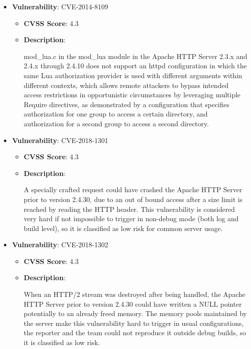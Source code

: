 \documentclass{article}
\begin{document}
\begin{itemize}
        \item \textbf{Vulnerability}: CVE-2014-8109
        \begin{itemize}
            \item \textbf{CVSS Score}:  4.3 
            \item \textbf{Description}:
            \parbox[t]{0.9\linewidth}{
                \ttfamily mod\_lua.c in the mod\_lua module in the Apache HTTP Server 2.3.x and 2.4.x through 2.4.10 does not support an httpd configuration in which the same Lua authorization provider is used with different arguments within different contexts, which allows remote attackers to bypass intended access restrictions in opportunistic circumstances by leveraging multiple Require directives, as demonstrated by a configuration that specifies authorization for one group to access a certain directory, and authorization for a second group to access a second directory.
            }
        \end{itemize}
    
        \item \textbf{Vulnerability}: CVE-2018-1301
        \begin{itemize}
            \item \textbf{CVSS Score}:  4.3 
            \item \textbf{Description}:
            \parbox[t]{0.9\linewidth}{
                \ttfamily A specially crafted request could have crashed the Apache HTTP Server prior to version 2.4.30, due to an out of bound access after a size limit is reached by reading the HTTP header. This vulnerability is considered very hard if not impossible to trigger in non-debug mode (both log and build level), so it is classified as low risk for common server usage.
            }
        \end{itemize}
    
        \item \textbf{Vulnerability}: CVE-2018-1302
        \begin{itemize}
            \item \textbf{CVSS Score}:  4.3 
            \item \textbf{Description}:
            \parbox[t]{0.9\linewidth}{
                \ttfamily When an HTTP/2 stream was destroyed after being handled, the Apache HTTP Server prior to version 2.4.30 could have written a NULL pointer potentially to an already freed memory. The memory pools maintained by the server make this vulnerability hard to trigger in usual configurations, the reporter and the team could not reproduce it outside debug builds, so it is classified as low risk.
            }
        \end{itemize}
    

\end{itemize}
\end{document}
